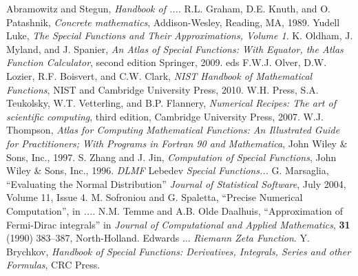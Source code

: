 \documentclass[10pt,dvipdfmx,letterpaper,twoside]{article}
\begin{document}
\begin{thebibliography}{WWWWW}
  Abramowitz and Stegun,
  \emph{Handbook of ...}.
R.L. Graham, D.E. Knuth, and O. Patashnik, \emph{Concrete
mathematics}, Addison-Wesley, Reading, MA, 1989.
  Yudell Luke,
  \emph{The Special Functions and Their Approximations, Volume 1}.
  K. Oldham, J. Myland, and J. Spanier,
  \emph{An Atlas of Special Functions: With Equator, the Atlas Function Calculator}, second edition
  Springer, 2009.
  eds F.W.J. Olver, D.W. Lozier, R.F. Boisvert, and C.W. Clark,
  \emph{NIST Handbook of Mathematical Functions},
  NIST and Cambridge University Press, 2010.
  W.H. Press, S.A. Teukolsky, W.T. Vetterling, and B.P. Flannery,
  \emph{Numerical Recipes: The art of scientific computing}, third edition,
  Cambridge University Press, 2007.
  W.J. Thompson,
  \emph{Atlas for Computing Mathematical Functions: An Illustrated Guide for Practitioners; With Programs in Fortran 90 and Mathematica},
  John Wiley \& Sons, Inc., 1997.
  S. Zhang and J. Jin,
  \emph{Computation of Special Functions},
  John Wiley \& Sons, Inc., 1996.
  \emph{DLMF}
  Lebedev
  \emph{Special Functions...}
  G. Marsaglia,
  ``Evaluating the Normal Distribution''
  \emph{Journal of Statistical Software},
  July 2004, Volume 11, Issue 4.
  M. Sofroniou and G. Spaletta,
  ``Precise Numerical Computation'',
  in \emph{...}.
  N.M. Temme and A.B. Olde Daalhuis,
  ``Approximation of Fermi-Dirac integrals''
  in \emph{Journal of Computational and Applied Mathematics},
  {\bf 31} (1990) 383--387, North-Holland.
  Edwards ...
  \emph{Riemann Zeta Function}.
  Y. Brychkov,
  \emph{Handbook of Special Functions: Derivatives, Integrals, Series and other Formulas},
  CRC Press.
\end{thebibliography}


\end{document}
